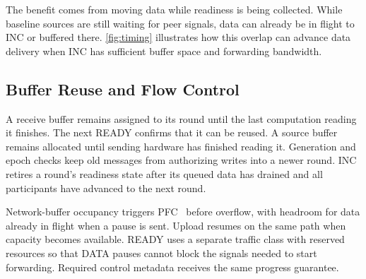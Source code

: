 The benefit comes from moving data while readiness is being collected. While baseline sources are still waiting for peer signals, data can already be in flight to INC or buffered there. \autoref{fig:timing} illustrates how this overlap can advance data delivery when INC has sufficient buffer space and forwarding bandwidth.

\subsection{Buffer Reuse and Flow Control}
\label{sec:resources}
A receive buffer remains assigned to its round until the last computation reading it finishes. The next READY confirms that it can be reused. A source buffer remains allocated until sending hardware has finished reading it. Generation and epoch checks keep old messages from authorizing writes into a newer round. INC retires a round's readiness state after its queued data has drained and all participants have advanced to the next round.

Network-buffer occupancy triggers PFC~\cite{pfc} before overflow, with headroom for data already in flight when a pause is sent. Upload resumes on the same path when capacity becomes available. READY uses a separate traffic class with reserved resources so that DATA pauses cannot block the signals needed to start forwarding. Required control metadata receives the same progress guarantee.
